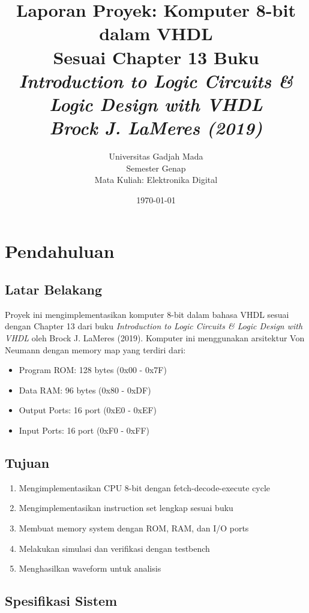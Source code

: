 \documentclass[12pt,a4paper]{report}
\title{
  \textbf{Laporan Proyek: Komputer 8-bit dalam VHDL} \\
  \large Sesuai Chapter 13 Buku \\
  \textit{Introduction to Logic Circuits \& Logic Design with VHDL} \\
  \textit{Brock J. LaMeres (2019)}
}
\author{
  Universitas Gadjah Mada \\
  Semester Genap \\
  Mata Kuliah: Elektronika Digital
}
\date{\today}
\begin{document}
\maketitle

\tableofcontents
\newpage

\chapter{Pendahuluan}

\section{Latar Belakang}

Proyek ini mengimplementasikan komputer 8-bit dalam bahasa VHDL sesuai dengan Chapter 13 dari buku \textit{Introduction to Logic Circuits \& Logic Design with VHDL} oleh Brock J. LaMeres (2019). Komputer ini menggunakan arsitektur Von Neumann dengan memory map yang terdiri dari:

\begin{itemize}
  \item Program ROM: 128 bytes (0x00 - 0x7F)
  \item Data RAM: 96 bytes (0x80 - 0xDF)
  \item Output Ports: 16 port (0xE0 - 0xEF)
  \item Input Ports: 16 port (0xF0 - 0xFF)
\end{itemize}

\section{Tujuan}

\begin{enumerate}
  \item Mengimplementasikan CPU 8-bit dengan fetch-decode-execute cycle
  \item Mengimplementasikan instruction set lengkap sesuai buku
  \item Membuat memory system dengan ROM, RAM, dan I/O ports
  \item Melakukan simulasi dan verifikasi dengan testbench
  \item Menghasilkan waveform untuk analisis
\end{enumerate}

\section{Spesifikasi Sistem}
\end{document}
